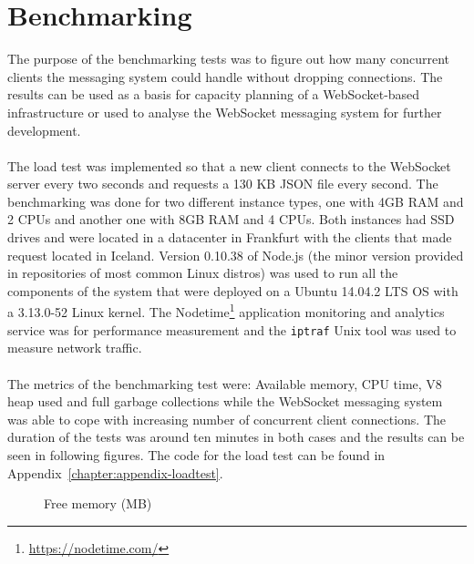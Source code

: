 \section{Benchmarking}

The purpose of the benchmarking tests was to figure out how many concurrent clients the messaging system could handle without dropping connections. The results can be used as a basis for capacity planning of a WebSocket-based infrastructure or used to analyse the WebSocket messaging system for further development.
\\ \\
The load test was implemented so that a new client connects to the WebSocket server every two seconds and requests a 130 KB JSON file every second. The benchmarking was done for two different instance types, one with 4GB RAM  and 2 CPUs and another one with 8GB RAM and 4 CPUs. Both instances had SSD drives and were located in a datacenter in Frankfurt with the clients that made request located in Iceland. Version 0.10.38 of Node.js (the minor version provided in repositories of most common Linux distros) was used to run all the components of the system that were deployed on a Ubuntu 14.04.2 LTS OS with a 3.13.0-52 Linux kernel. The Nodetime\footnote{\url{https://nodetime.com/}} application monitoring and analytics service was for performance measurement and the \texttt{iptraf} Unix tool was used to measure network traffic.
\\ \\
The metrics of the benchmarking test were: Available memory, CPU time, V8 heap used and full garbage collections while the WebSocket messaging system was able to cope with increasing number of concurrent client connections. The duration of the tests was around ten minutes in both cases and the results can be seen in following figures. The code for the load test can be found in Appendix~\ref{chapter:appendix-loadtest}.
\\
\begin{figure}[h!]
	\centering
	 \hfill
	\caption{Free memory (MB)}
	\label{fig:freeMemory}
\end{figure}

